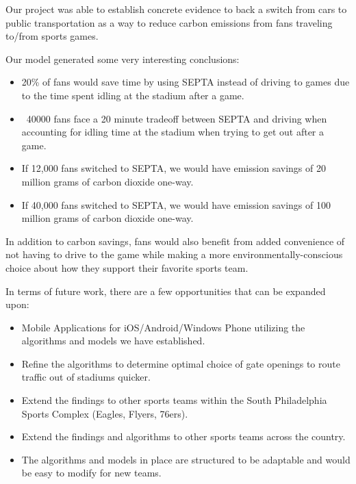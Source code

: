 Our project was able to establish concrete evidence to back a switch
from cars to public transportation as a way to reduce carbon emissions
from fans traveling to/from sports games.

Our model generated some very interesting conclusions:
\begin{itemize}
    \item 20\% of fans would save time by using SEPTA instead of
  driving to games due to the time spent idling at the stadium after a
  game.
    \item ~40000 fans face a 20 minute tradeoff between SEPTA and
  driving when accounting for idling time at the stadium when trying
  to get out after a game.
    \item If 12,000 fans switched to SEPTA, we would have emission
  savings of 20 million grams of carbon dioxide one-way.
    \item If 40,000 fans switched to SEPTA, we would have emission
  savings of 100 million grams of carbon dioxide one-way.
\end{itemize}

In addition to carbon savings, fans would also benefit from added
convenience of not having to drive to the game while making a more
environmentally-conscious choice about how they support their favorite
sports team.

In terms of future work, there are a few opportunities that can be
expanded upon:
\begin{itemize}
    \item Mobile Applications for iOS/Android/Windows Phone utilizing
  the algorithms and models we have established.
    \item Refine the algorithms to determine optimal choice of gate
  openings to route traffic out of stadiums quicker.
    \item Extend the findings to other sports teams within the South
  Philadelphia Sports Complex (Eagles, Flyers, 76ers).
    \item Extend the findings and algorithms to other sports teams
  across the country.
    \item The algorithms and models in place are structured to be
  adaptable and would be easy to modify for new teams.
\end{itemize}
